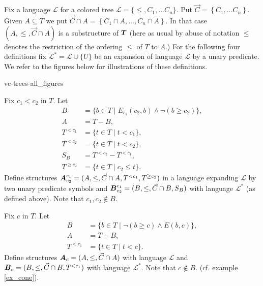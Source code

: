 \documentclass{amsart}
\DeclareMathOperator{\TT}{\boldface T}
\DeclareMathOperator{\AT}{\boldface A}
\DeclareMathOperator{\BT}{\boldface B}
\renewcommand{\LL}{\mathcal L}
\newcommand{\LLU}{\LL^*}
\newcommand{\curly}[1]{\left\{#1\right\}}
\begin{document}
Fix a language $\LL$ for a colored tree $\LL = \{\leq, C_1, \ldots C_n\}$. Put  $\vec C = \curly{C_1, \ldots C_n}$.
Given $A \subseteq T$ we put $\vec C \cap A = \curly{C_1 \cap A, \ldots, C_n \cap A}$.
In that case $(A, \leq, \vec C \cap A)$ is a substructure of $\TT$ (here as usual by abuse of notation $\leq$ denotes the restriction of the ordering $\leq$ of $T$ to $A$.)
For the following four definitions fix $\LLU = \LL \cup \{U\}$ be an expansion of language $\LL$ by a unary predicate.
We refer to the figures below for illustrations of these definitions.

 {vc-trees-all_figures}

\begin{Definition}
  Fix $c_1 < c_2$ in $T$. Let
  \begin{align*}
    B &= \{b \in T \mid E_{c_1}(c_2, b) \wedge \neg(b \geq c_2)\}, \\
    A &= T - B, \\
    T^{<c_1} &= \{t \in T \mid t < c_1\}, \\
    T^{<c_2} &= \{t \in T \mid t < c_2\}, \\
    S_B &= T^{<c_2} - T^{<c_1}, \\
    T^{\geq c_2} &= \{t \in T \mid c_2 \leq t\}.
  \end{align*}
  Define structures $\AT^{c_1}_{c_2} = (A, \leq, \vec C \cap A, T^{<c_1}, T^{\geq c_2})$ in a language expanding $\LL$ by two unary predicate symbols and
  $\BT^{c_1}_{c_2} = (B, \leq, \vec C \cap B, S_B)$ with language $\LLU$ (as defined above).
  Note that $c_1, c_2 \notin B$.
\end{Definition}


\begin{Definition}
  Fix $c$ in $T$. Let
  \begin{align*}
    B &= \{b \in T \mid \neg(b \geq c) \wedge E(b,c)\}, \\
    A &= T - B, \\
    T^{<c_1} &= \{t \in T \mid t < c\}.
  \end{align*}
  Define structures $\AT_{c} = (A, \leq, \vec C \cap A)$ with language $\LL$ and $\BT_{c} = (B, \leq, \vec C\cap B, T^{<c_1})$ with language $\LLU$.
  Note that $c \notin B$. (cf. example \ref{ex_cone}).
\end{Definition}
\end{document}
